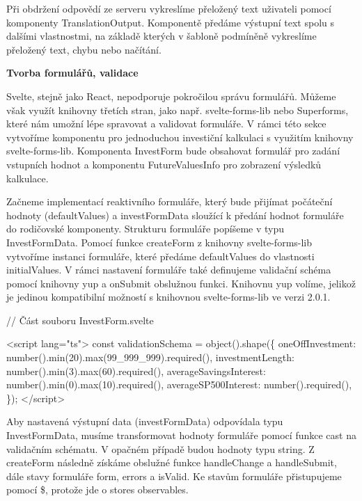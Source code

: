 Při obdržení odpovědí ze serveru vykreslíme přeložený text uživateli pomocí komponenty TranslationOutput. 
Komponentě předáme výstupní text spolu s dalšími vlastnostmi, na základě kterých v šabloně podmíněně vykreslíme přeložený text, chybu nebo načítání.

\begin{flushleft}
  \textbf{Tvorba formulářů, validace}
\end{flushleft}

Svelte, stejně jako React, nepodporuje pokročilou správu formulářů. Můžeme však využít knihovny třetích stran, jako např. svelte-forms-lib nebo Superforms, které nám umožní lépe spravovat a validovat formuláře. 
V rámci této sekce vytvoříme komponentu pro jednoduchou investiční kalkulaci s využitím knihovny svelte-forms-lib. 
Komponenta InvestForm bude obsahovat formulář pro zadání vstupních hodnot a komponentu FutureValuesInfo pro zobrazení výsledků kalkulace.

Začneme implementací reaktivního formuláře, který bude přijímat počáteční hodnoty (defaultValues) a investFormData sloužící k předání hodnot formuláře do rodičovské komponenty. 
Strukturu formuláře popíšeme v typu InvestFormData. Pomocí funkce createForm z knihovny svelte-forms-lib vytvoříme instanci formuláře, které předáme defaultValues do vlastnosti initialValues. 
V rámci nastavení formuláře také definujeme validační schéma pomocí knihovny yup a onSubmit obslužnou funkci. Knihovnu yup volíme, jelikož je jedinou kompatibilní možností s knihovnou svelte-forms-lib ve verzi 2.0.1. 

\begin{prog}
// Část souboru InvestForm.svelte

<script lang="ts">
  const validationSchema = object().shape(\{
    oneOffInvestment: number().min(20).max(99_999_999).required(),
    investmentLength: number().min(3).max(60).required(),
    averageSavingsInterest: number().min(0).max(10).required(),
    averageSP500Interest: number().required(),
  \});
</script>
\end{prog}

Aby nastavená výstupní data (investFormData) odpovídala typu InvestFormData, musíme transformovat hodnoty formuláře pomocí funkce cast na validačním schématu. V opačném případě budou hodnoty typu string. 
Z createForm následně získáme obslužné funkce handleChange a handleSubmit, dále stavy formuláře form, errors a isValid. Ke stavům formuláře přistupujeme pomocí \$, protože jde o stores observables.

